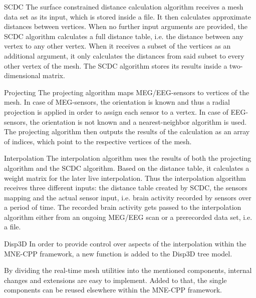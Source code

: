 \begin{aims}
	
	\item[SCDC] 
	The surface constrained distance calculation algorithm receives a mesh data set as its input, which is stored inside a file. It then calculates approximate distances between vertices. When no further input arguments are provided, the SCDC algorithm calculates a full distance table, i.e. the distance between any vertex to any other vertex.
	When it receives a subset of the vertices as an additional argument, it only calculates the distances from said subset to every other vertex of the mesh. The SCDC algorithm stores its results inside a two-dimensional matrix.
	
	\item[Projecting]
	The projecting algorithm maps MEG/EEG-sensors to vertices of the mesh. In case of MEG-sensors, the orientation is known and thus a radial projection is applied in order to assign each sensor to a vertex. In case of EEG-sensors, the orientation is not known and a nearest-neighbor algorithm is used.
	The projecting algorithm then outputs the results of the calculation as an array of indices, which point to the respective vertices of the mesh.
	
	\item[Interpolation]
	The interpolation algorithm uses the results of both the projecting algorithm and the SCDC algorithm.
	Based on the distance table, it calculates a weight matrix for the later live interpolation. 
	Thus the interpolation algorithm receives three different inputs: the distance table created by SCDC, the sensors mapping and the actual sensor input, i.e. brain activity recorded by sensors over a period of time.
	The recorded brain activity gets passed to the interpolation algorithm either from an ongoing MEG/EEG scan or a prerecorded data set, i.e. a file. 
	
	\item[Disp3D]
	In order to provide control over aspects of the interpolation within the MNE-CPP framework, a new function is added to the Disp3D tree model.
		
\end{aims}

By dividing the real-time mesh utilities into the mentioned components, internal changes and extensions are easy to implement. Added to that, the single components can be reused elsewhere within the MNE-CPP framework.

\clearpage


